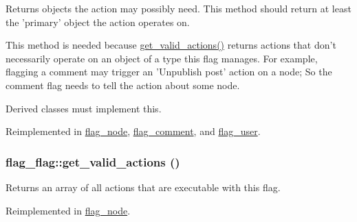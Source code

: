 Returns objects the action may possibly need. This method should return at least the 'primary' object the action operates on.

This method is needed because \hyperlink{group__actions_gbe1aa2bfc551fab8660cc3bacfc9d509}{get\_\-valid\_\-actions()} returns actions that don't necessarily operate on an object of a type this flag manages. For example, flagging a comment may trigger an 'Unpublish post' action on a node; So the comment flag needs to tell the action about some node.

Derived classes must implement this.

Reimplemented in \hyperlink{classflag__node_9578593ef74f207710a83242de8325f9}{flag\_\-node}, \hyperlink{classflag__comment_9092237266a5e5fce69be0a4cdfd602e}{flag\_\-comment}, and \hyperlink{classflag__user_92be6b0492226ca0feb1f2dc486d519e}{flag\_\-user}.\hypertarget{group__actions_gbe1aa2bfc551fab8660cc3bacfc9d509}{
\subsubsection[{get\_\-valid\_\-actions}]{\setlength{\rightskip}{0pt plus 5cm}flag\_\-flag::get\_\-valid\_\-actions ()}}
\label{group__actions_gbe1aa2bfc551fab8660cc3bacfc9d509}


Returns an array of all actions that are executable with this flag. 

Reimplemented in \hyperlink{classflag__node_6bb9b8d25c34816cd3e7b5c11038374a}{flag\_\-node}.
